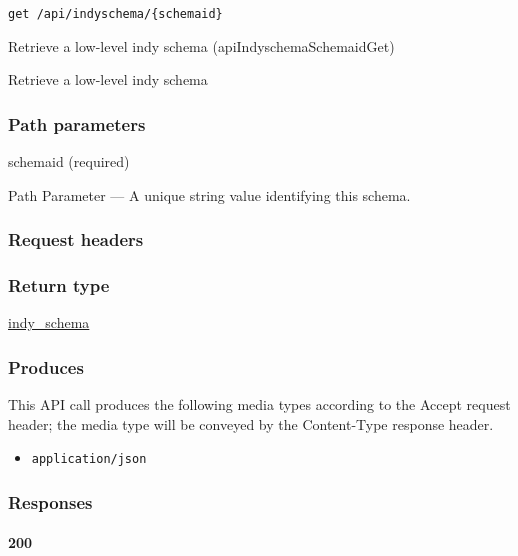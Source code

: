 \protect\hypertarget{apiIndyschemaSchemaidGet}{}{}

\begin{verbatim}
get /api/indyschema/{schemaid}
\end{verbatim}

Retrieve a low-level indy schema ({apiIndyschemaSchemaidGet})

Retrieve a low-level indy schema

\hypertarget{path-parameters-36}{%
\subsubsection{Path parameters}\label{path-parameters-36}}

schemaid (required)

{Path Parameter} --- A unique string value identifying this schema.

\hypertarget{request-headers-42}{%
\subsubsection{Request headers}\label{request-headers-42}}

\hypertarget{return-type-60}{%
\subsubsection{Return type}\label{return-type-60}}

\protect\hyperlink{indy_schema}{indy\_schema}

\hypertarget{produces-74}{%
\subsubsection{Produces}\label{produces-74}}

This API call produces the following media types according to the
{Accept} request header; the media type will be conveyed by the
{Content-Type} response header.

\begin{itemize}
\tightlist
\item
  \texttt{application/json}
\end{itemize}

\hypertarget{responses-74}{%
\subsubsection{Responses}\label{responses-74}}

\hypertarget{section-246}{%
\paragraph{200}\label{section-246}}

